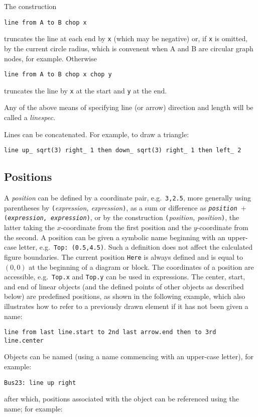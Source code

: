 The construction

{\tt line from A to B chop x}

\noindent
truncates the line at each end by {\tt x} (which may be negative)
or, if {\tt x} is omitted, by
the current circle radius, which is convenent when A and B are
circular graph nodes, for example.  Otherwise

{\tt line from A to B chop x chop y}

\noindent
truncates the line by {\tt x} at the start and {\tt y} at the end.

Any of the above means of specifying line (or arrow) direction and length
will be called a {\em linespec.}

Lines can be concatenated.  For example, to draw a triangle:

{\tt line up\_ sqrt(3) right\_ 1 then down\_ sqrt(3) right\_ 1 then left\_ 2}

\subsection{Positions}
A {\sl position} can be defined by a coordinate pair, e.g.\ {\tt 3,2.5},
more generally using parentheses by {\tt (}{\sl expression, expression}{\tt )},
as a sum or difference as
{\tt{\sl position} $+$ ({\sl expression, expression})},
or by the construction {\tt (}{\sl position, position}{\tt)},
the latter taking the $x$-coordinate from the first
position and the $y$-coordinate from the second.  A position can be
given a symbolic name beginning with an upper-case letter,
e.g.\ {\tt Top:~(0.5,4.5)}.  Such a definition does not affect the calculated
figure boundaries.  The current position {\tt Here} is always defined and
is equal to $(0,0)$ at the beginning of a diagram or block.
The coordinates of a position are accessible, e.g.\ {\tt Top.x} and
{\tt Top.y} can be used in expressions.  The center, start, and end of
linear objects (and the defined points of other objects as described below)
are predefined positions, as shown in the following example,
which also illustrates how to refer to a previously drawn element if it has
not been given a name:

{\tt line from last line.start to 2nd last arrow.end then to 3rd line.center}

Objects can be named (using a name commencing with an upper-case letter),
for example:

{\tt Bus23: line up right}

\noindent
after which, positions associated with the object can be referenced using the
name; for example:

